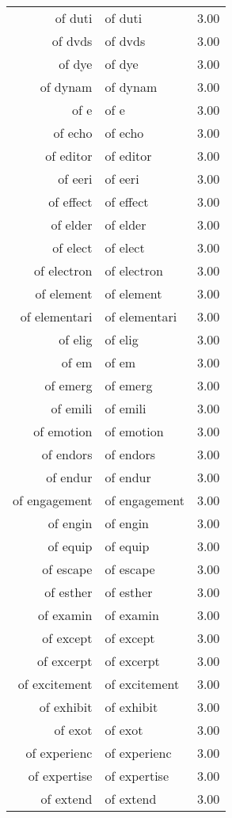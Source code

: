 \begin{table}[ht]
\begin{tabular}{rlr}
  of duti & of duti & 3.00 \\ 
  of dvds & of dvds & 3.00 \\ 
  of dye & of dye & 3.00 \\ 
  of dynam & of dynam & 3.00 \\ 
  of e & of e & 3.00 \\ 
  of echo & of echo & 3.00 \\ 
  of editor & of editor & 3.00 \\ 
  of eeri & of eeri & 3.00 \\ 
  of effect & of effect & 3.00 \\ 
  of elder & of elder & 3.00 \\ 
  of elect & of elect & 3.00 \\ 
  of electron & of electron & 3.00 \\ 
  of element & of element & 3.00 \\ 
  of elementari & of elementari & 3.00 \\ 
  of elig & of elig & 3.00 \\ 
  of em & of em & 3.00 \\ 
  of emerg & of emerg & 3.00 \\ 
  of emili & of emili & 3.00 \\ 
  of emotion & of emotion & 3.00 \\ 
  of endors & of endors & 3.00 \\ 
  of endur & of endur & 3.00 \\ 
  of engagement & of engagement & 3.00 \\ 
  of engin & of engin & 3.00 \\ 
  of equip & of equip & 3.00 \\ 
  of escape & of escape & 3.00 \\ 
  of esther & of esther & 3.00 \\ 
  of examin & of examin & 3.00 \\ 
  of except & of except & 3.00 \\ 
  of excerpt & of excerpt & 3.00 \\ 
  of excitement & of excitement & 3.00 \\ 
  of exhibit & of exhibit & 3.00 \\ 
  of exot & of exot & 3.00 \\ 
  of experienc & of experienc & 3.00 \\ 
  of expertise & of expertise & 3.00 \\ 
  of extend & of extend & 3.00 \\ 

\end{tabular}
\end{table}
